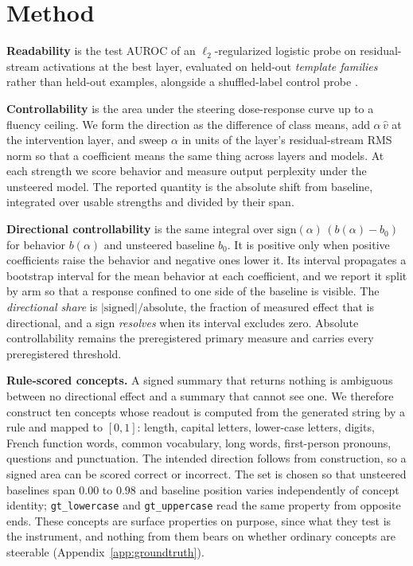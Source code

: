 \documentclass{article}
\begin{document}
\section{Method}
\label{sec:method}

\textbf{Readability} is the test AUROC of an $\ell_2$-regularized logistic probe
on residual-stream activations at the best layer, evaluated on held-out
\emph{template families} rather than held-out examples, alongside a
shuffled-label control probe \citep{hewitt2019control}.

\textbf{Controllability} is the area under the steering dose-response curve up to
a fluency ceiling. We form the direction as the difference of class means, add
$\alpha\,\hat v$ at the intervention layer, and sweep $\alpha$ in units of the
layer's residual-stream RMS norm so that a coefficient means the same thing
across layers and models. At each strength we score behavior and measure output
perplexity under the unsteered model. The reported quantity is the absolute
shift from baseline, integrated over usable strengths and divided by their span.

\textbf{Directional controllability} is the same integral over
$\mathrm{sign}(\alpha)\,(b(\alpha) - b_0)$ for behavior $b(\alpha)$ and unsteered
baseline $b_0$. It is positive only when positive coefficients raise the
behavior and negative ones lower it. Its interval propagates a bootstrap
interval for the mean behavior at each coefficient, and we report it split by
arm so that a response confined to one side of the baseline is visible. The
\emph{directional share} is $|\text{signed}|/\text{absolute}$, the fraction of
measured effect that is directional, and a sign \emph{resolves} when its
interval excludes zero. Absolute controllability remains the preregistered
primary measure and carries every preregistered threshold.

\textbf{Rule-scored concepts.} A signed summary that returns nothing is
ambiguous between no directional effect and a summary that cannot see one. We
therefore construct ten concepts whose readout is computed from the generated
string by a rule and mapped to $[0,1]$: length, capital letters, lower-case
letters, digits, French function words, common vocabulary, long words,
first-person pronouns, questions and punctuation. The intended direction follows
from construction, so a signed area can be scored correct or incorrect. The set
is chosen so that unsteered baselines span $0.00$ to $0.98$ and baseline position
varies independently of concept identity; \texttt{gt\_lowercase} and
\texttt{gt\_uppercase} read the same property from opposite ends. These concepts
are surface properties on purpose, since what they test is the instrument, and
nothing from them bears on whether ordinary concepts are steerable
(Appendix~\ref{app:groundtruth}).
\end{document}
